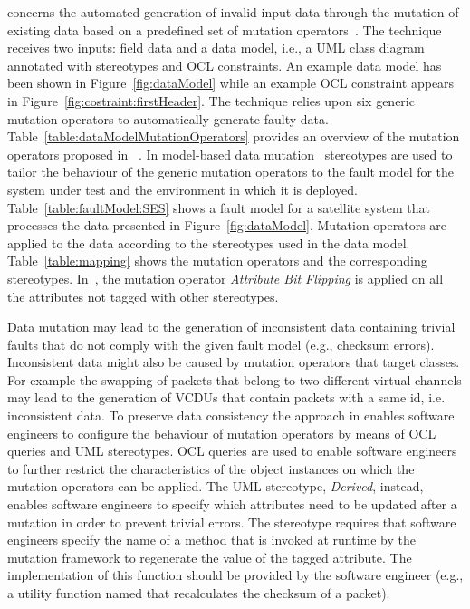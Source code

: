 


 concerns the automated generation of invalid input data through the mutation of existing data based on a predefined set of mutation operators~\cite{di2015generating}.
The technique receives two inputs: field data and a data model, i.e., a UML class diagram annotated with stereotypes and OCL constraints. 
An example data model has been shown in Figure~\ref{fig:dataModel} while an example OCL constraint appears in Figure~\ref{fig:costraint:firstHeader}. 
The technique relies upon six generic mutation operators to automatically generate faulty data. 
Table~\ref{table:dataModelMutationOperators} provides an overview of the mutation operators proposed in ~\cite{di2015generating}.
In model-based data mutation~\cite{di2015generating} stereotypes are used to tailor the behaviour of the generic mutation operators to the fault model for the system under test and the environment in which it is deployed. 
Table~\ref{table:faultModel:SES} shows a fault model for a satellite system that processes the data presented in Figure~\ref{fig:dataModel}.
Mutation operators are applied to the data according to the stereotypes used in the data model.
Table~\ref{table:mapping} shows the mutation operators and the corresponding stereotypes. In~\cite{di2015generating}, the mutation operator \emph{Attribute Bit Flipping} is applied on all the attributes not tagged with other stereotypes. 







Data mutation may lead to the generation of inconsistent data containing trivial faults that do not comply with the given fault model (e.g., checksum errors). 
Inconsistent data might also be caused by mutation operators that target classes. For example the swapping of packets that belong to two different virtual channels may lead to the generation of VCDUs that contain packets with a same id, i.e. inconsistent data. To preserve data consistency the approach in \cite{di2015generating} enables software engineers to configure the behaviour of mutation operators by means of OCL queries and UML stereotypes. OCL queries are used to enable software engineers to further restrict the characteristics of the object instances on which the mutation operators can be applied.   The UML stereotype, \emph{Derived}, instead, enables software engineers to specify which attributes need to be updated after a mutation in order to prevent trivial errors. The stereotype requires that software engineers specify the name of a method that is invoked at runtime by the mutation framework to regenerate the value of the tagged attribute. The implementation of this function should be provided by the software engineer (e.g., a utility function named that recalculates the checksum of a packet). 



